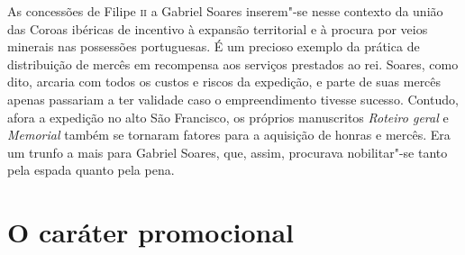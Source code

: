 As concessões de Filipe \textsc{ii} a Gabriel Soares inserem"-se nesse contexto da
união das Coroas ibéricas de incentivo à expansão territorial e à
procura por veios minerais nas possessões portuguesas. É um precioso
exemplo da prática de distribuição de mercês em recompensa aos serviços
prestados ao rei. Soares, como dito, arcaria com todos os custos e
riscos da expedição, e parte de suas mercês apenas passariam a ter
validade caso o empreendimento tivesse sucesso. Contudo, afora a
expedição no alto São Francisco, os próprios manuscritos
\textit{Roteiro geral} e \textit{Memorial} também se tornaram fatores
para a aquisição de honras e mercês. Era um trunfo a mais para Gabriel
Soares, que, assim, procurava nobilitar"-se tanto pela espada quanto
pela pena.

\section{O caráter promocional}

